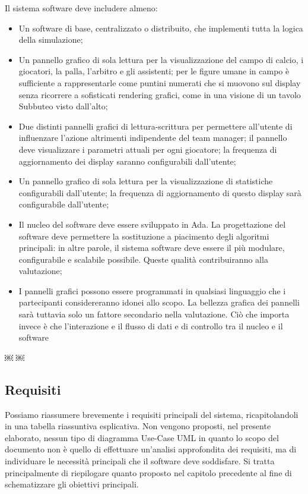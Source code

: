 \documentclass[aps,letterpaper,10pt]{article}
\begin{document}
Il sistema software deve includere almeno:
\begin{itemize}
	\item Un software di base, centralizzato o distribuito, che implementi tutta la logica della simulazione;
\item Un pannello grafico di sola lettura per la visualizzazione del campo di calcio, i giocatori, la palla, l'arbitro e
gli assistenti; per le figure umane in campo \`e sufficiente a rappresentarle come puntini numerati che si muovono sul
display senza ricorrere a sofisticati rendering grafici, come in una visione di un tavolo Subbuteo visto dall'alto;
\item Due distinti pannelli grafici di lettura-scrittura per permettere all'utente di influenzare l'azione altrimenti
indipendente del team manager; il pannello deve visualizzare i parametri attuali per ogni giocatore; la frequenza di
aggiornamento dei display saranno configurabili dall'utente;
\item Un pannello grafico di sola lettura per la visualizzazione di statistiche configurabili dall'utente; la frequenza
di aggiornamento di questo display sar\`a configurabile dall'utente;
\item Il nucleo del software deve essere sviluppato in Ada. La progettazione del software deve permettere la
sostituzione a piacimento degli algoritmi principali: in altre parole, il sistema software deve essere il pi\`u
modulare, configurabile e scalabile possibile. Queste qualit\`a contribuiranno alla valutazione;
\item I pannelli grafici possono essere programmati in qualsiasi linguaggio che i partecipanti considereranno idonei
allo scopo. La bellezza grafica dei pannelli sar\`a tuttavia solo un fattore secondario nella valutazione. Ci\`o che
importa invece \`e che l'interazione e il flusso di dati e di controllo tra il nucleo e il software
\end{itemize}
￼ ￼
\subsection{Requisiti} 

Possiamo riassumere brevemente i requisiti principali del sistema, ricapitolandoli in una tabella riassuntiva
esplicativa. Non vengono proposti, nel presente elaborato, nessun tipo di diagramma Use-Case UML in quanto lo scopo del
documento non \`e quello di effettuare un'analisi approfondita dei requisiti, ma di individuare le necessit\`a
principali che il software deve soddisfare. Si tratta principalmente di riepilogare quanto proposto nel capitolo
precedente al fine di schematizzare gli obiettivi principali.
\end{document}

